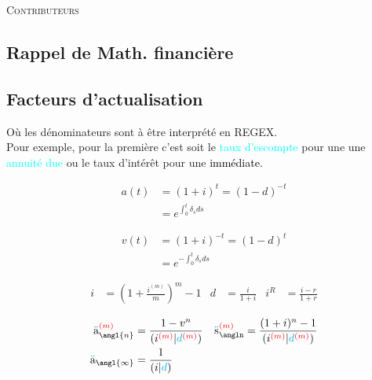 \documentclass[10pt, french]{article}
\newcommand\cumlaut[2][black]{\stackon[.33ex]{#2}{\textcolor{#1}{\kern-.04ex.\kern-.2ex.}}}
\begin{document}
\begin{center}
	\textsc{\Large Contributeurs}\\[0.5cm] 
\end{center}


\newpage

\raggedcolumns
\footnotesize %
\begin{multicols*}{3} 	%
\section*{Rappel de Math. financière}
\subsection*{Facteurs d'actualisation}
Où les dénominateurs sont à être interprété en REGEX.\\
Pour exemple, pour la première c’est soit le \textcolor{cyan}{taux d'escompte} pour une une \textcolor{cyan}{annuité due} ou le taux d'intérêt pour une \textcolor{black}{immédiate}.

\setlength{\mathindent}{-1cm}
\begin{minipage}{0.5\columnwidth}
\begin{align*}
	a(t) 
		&= 	(1 + i)^{t} 
		= 	(1 - d)^{-t}		\\
	&= 	e^{\int_{0}^{t} \delta_s ds} %
\end{align*}
\end{minipage}
\begin{minipage}{0.5\columnwidth}
\begin{align*}
	v(t) 
		&= 	(1 + i)^{-t} 
		= 	(1 - d)^{t}	 \\
	&= 	e^{-\int_{0}^{t} \delta_s ds} %
\end{align*}
\end{minipage}
\begin{align*}
	i 	&= \left( 1 + \frac{i^{(m)}}{m} \right)^{m} - 1 &
	d	&= 	\frac{i}{1 + i} &
	i^{R}
		&=	\frac{i - r}{1 + r}
\end{align*}

\begin{align*}
	\cumlaut[cyan]{a}_{\angl{n}}^{\textcolor{red}{(m)}} 
		&= \frac{1 - v^n}{ (i^{\textcolor{red}{(m)}}{\color{black}|}{\color{cyan}d}^{\textcolor{red}{(m)}}{\color{black})}}	&
	\cumlaut[cyan]{s}_{\angln}^{\textcolor{red}{(m)}} 
		&=	\frac{(1+i)^{n} - 1}{(i^{\textcolor{red}{(m)}} | \textcolor{cyan}{d}^{\textcolor{red}{(m)}})}	\\
	\cumlaut[cyan]{a}_{\angl{\infty}} 
		&= \frac{1}{(i|\textcolor{cyan}{d})}
\end{align*}


\end{multicols*}
\end{document}
